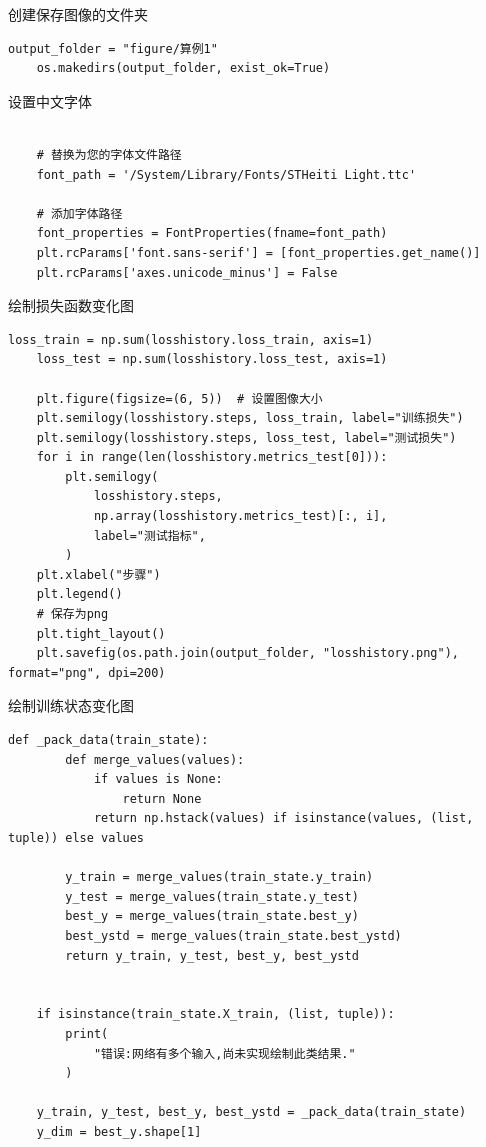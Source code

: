 \documentclass{Sichuan Normal University}
\begin{document}
\noindent 创建保存图像的文件夹
\begin{lstlisting}[style=python,basicstyle=\footnotesize\fontspec{Courier New},]  
    output_folder = "figure/算例1"
    os.makedirs(output_folder, exist_ok=True)
\end{lstlisting}
设置中文字体
\begin{lstlisting}[style=python,basicstyle=\footnotesize\fontspec{Courier New},]  
    
    # 替换为您的字体文件路径
    font_path = '/System/Library/Fonts/STHeiti Light.ttc'
    
    # 添加字体路径
    font_properties = FontProperties(fname=font_path)
    plt.rcParams['font.sans-serif'] = [font_properties.get_name()]
    plt.rcParams['axes.unicode_minus'] = False
\end{lstlisting}  
绘制损失函数变化图
\begin{lstlisting}[style=python,basicstyle=\footnotesize\fontspec{Courier New},]  
    loss_train = np.sum(losshistory.loss_train, axis=1)
    loss_test = np.sum(losshistory.loss_test, axis=1)
    
    plt.figure(figsize=(6, 5))  # 设置图像大小
    plt.semilogy(losshistory.steps, loss_train, label="训练损失")
    plt.semilogy(losshistory.steps, loss_test, label="测试损失")
    for i in range(len(losshistory.metrics_test[0])):
        plt.semilogy(
            losshistory.steps,
            np.array(losshistory.metrics_test)[:, i],
            label="测试指标",
        )
    plt.xlabel("步骤")
    plt.legend()
    # 保存为png
    plt.tight_layout()
    plt.savefig(os.path.join(output_folder, "losshistory.png"), format="png", dpi=200)
\end{lstlisting}  
绘制训练状态变化图
\begin{lstlisting}[style=python,basicstyle=\footnotesize\fontspec{Courier New},]     
    def _pack_data(train_state):
        def merge_values(values):
            if values is None:
                return None
            return np.hstack(values) if isinstance(values, (list, tuple)) else values
    
        y_train = merge_values(train_state.y_train)
        y_test = merge_values(train_state.y_test)
        best_y = merge_values(train_state.best_y)
        best_ystd = merge_values(train_state.best_ystd)
        return y_train, y_test, best_y, best_ystd
    
    
    if isinstance(train_state.X_train, (list, tuple)):
        print(
            "错误:网络有多个输入,尚未实现绘制此类结果."
        )
    
    y_train, y_test, best_y, best_ystd = _pack_data(train_state)
    y_dim = best_y.shape[1]
\end{lstlisting}  
\end{document}
